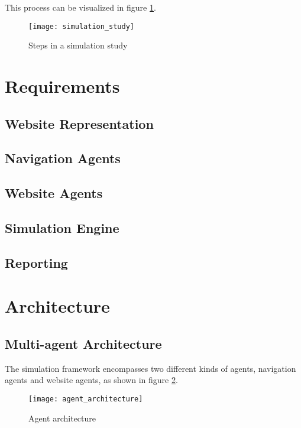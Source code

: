 This process can be visualized in figure \ref{fig:sim}.

\begin{figure}[h]
    \begin{center}
        \leavevmode
        \texttt{[image: simulation\_study]}
        \caption{Steps in a simulation study \cite{Banks2004}}
        \label{fig:sim}
    \end{center}
\end{figure}

\section{Requirements}

\subsection{Website Representation}
\subsection{Navigation Agents}
\subsection{Website Agents}
\subsection{Simulation Engine}
\subsection{Reporting}

\section{Architecture}

\subsection{Multi-agent Architecture}

The simulation framework encompasses two different kinds of agents, navigation 
agents and website agents, as shown in figure \ref{fig:agent_arch}.

\begin{figure}[h]
    \begin{center}
        \leavevmode
        \texttt{[image: agent\_architecture]}
        \caption{Agent architecture}
        \label{fig:agent_arch}
    \end{center}
\end{figure}

